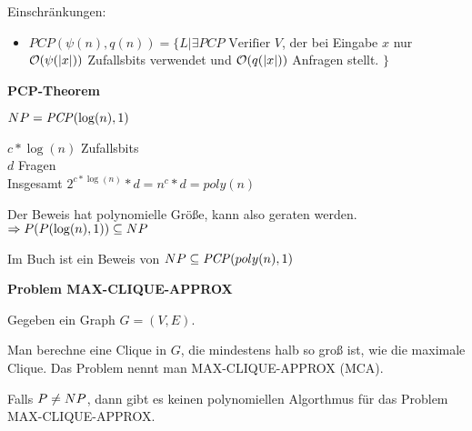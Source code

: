 Einschränkungen:
\begin{itemize}
    \item $\mathit{PCP}(\psi(n), q(n)) = \{ L | \exists \mathit{PCP}
            \text{ Verifier } V $, der bei Eingabe $x$ nur $\mathcal{O}(\psi(|x|))$
            Zufallsbits verwendet und $\mathcal{O}(q(|x|))$ Anfragen stellt.
            $\}$
\end{itemize}



\begin{satz}
    \textbf{PCP-Theorem}

    $NP = \mathit{PCP}(\log(n), 1)$

    $c * \log(n)$ Zufallsbits
    \\
    $d$ Fragen
    \\
    Insgesamt $2^{c * \log(n)} * d = n^c * d = poly(n)$

    Der Beweis hat polynomielle Größe, kann also geraten werden.
    \\
    $\Rightarrow P(P(\log(n), 1)) \subseteq NP$

\end{satz}


Im Buch ist ein Beweis von
$NP \subseteq \mathit{PCP}(poly(n), 1)$








\textbf{ Problem MAX-CLIQUE-APPROX }

Gegeben ein Graph $G = (V, E)$.

Man berechne eine Clique in $G$, die mindestens halb so groß ist, wie die
maximale Clique.
Das Problem nennt man MAX-CLIQUE-APPROX (MCA).


\begin{satz}
    Falls $P \neq NP$, dann gibt es keinen
    polynomiellen Algorthmus für das Problem MAX-CLIQUE-APPROX.
\end{satz}

